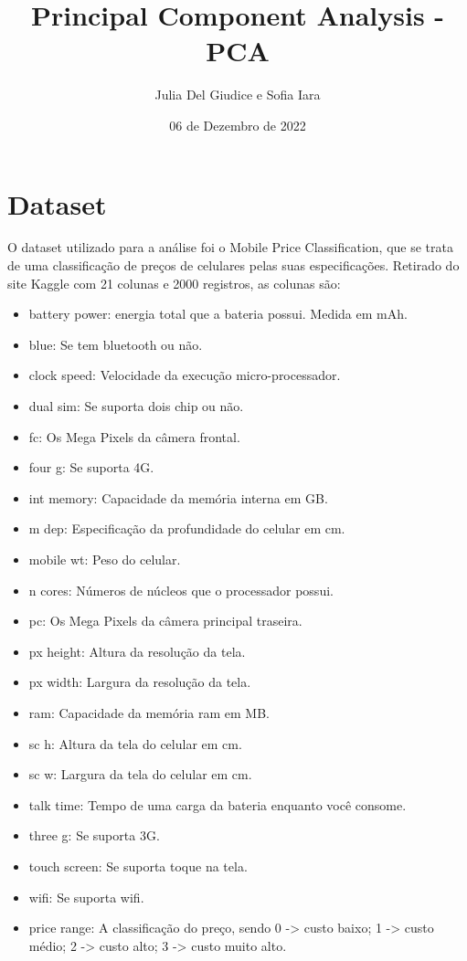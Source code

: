 \documentclass{report}
\title{Principal Component Analysis - PCA}
\author{Julia Del Giudice e Sofia Iara}
\date{06 de Dezembro de 2022}
\begin{document}
\maketitle

\section{Dataset}
O dataset utilizado para a análise foi o Mobile Price Classification, que se trata de uma classificação de preços de celulares pelas suas especificações. Retirado do site Kaggle com 21 colunas e 2000 registros, as colunas são:
\begin{itemize}
\item battery power: energia total que a bateria possui. Medida em mAh.
\item blue: Se tem bluetooth ou não.
\item clock speed: Velocidade da execução micro-processador.
\item dual sim: Se suporta dois chip ou não.
\item fc: Os Mega Pixels da câmera frontal.
\item four g: Se suporta 4G.
\item int memory: Capacidade da memória interna em GB.
\item m dep: Especificação da profundidade do celular em cm.
\item mobile wt: Peso do celular.
\item n cores: Números de núcleos que o processador possui.
\item pc: Os Mega Pixels da câmera principal traseira.
\item px height: Altura da resolução da tela.
\item px width: Largura da resolução da tela.
\item ram: Capacidade da memória ram em MB.
\item sc h: Altura da tela do celular em cm.
\item sc w: Largura da tela do celular em cm.
\item talk time: Tempo de uma carga da bateria enquanto você consome.
\item three g: Se suporta 3G.
\item touch screen: Se suporta toque na tela.
\item wifi: Se suporta wifi.
\item price range: A classificação do preço, sendo 0 -> custo baixo; 1 -> custo médio; 2 -> custo alto; 3 -> custo muito alto.
\end{itemize}
\end{document}
